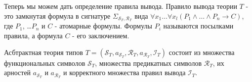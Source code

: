 \documentclass{amsart}
\theoremstyle{definition}
\theoremstyle{remark}
\numberwithin{figure}{section}
\begin{document}
Теперь мы можем дать определение правила вывода.
Правило вывода теории $T$ - это замкнутая формула в сигнатуре $\Sigma_{\mathcal{S}_T, \mathcal{R}_T}$ вида $\forall x_1 \ldots \forall x_l (P_1 \land \ldots \land P_n \to C)$, где $P_1$, \ldots $P_n$ и $C$ - атомарные формулы.
Формулы $P_i$ называются посылками правила, а формула $C$ - его заключением.

\begin{comment}
Пусть $Th$ - произвольная теория сигнатуры $\Sigma_{\mathcal{S}_T, \mathcal{R}_T}$.
Мы будем говорить, что посылка или заключение $P_i$ правила вывода $\forall x_1 \ldots \forall x_l (P_1 \land \ldots \land P_n \to P_{n+1})$ корректно в $Th$, если выполнено одно из следующих условий:
\begin{itemize}
\item $P_i = R(a_1, \ldots a_k)$ для некоторого $R \in \mathcal{R}_T$ и некоторых термов $a_1$, \ldots $a_k$.
\item $P_i = Tm_k(A_1, \ldots A_k, a, A_{k + 1})$ для некоторого $k \in \mathbb{N}$ и некоторых термов $A_1$, \ldots $A_{m + 1}$ и $a$ таких, что для любого $1 \leq j \leq m + 1$ в $Th$ выводима формула $P_1 \land \ldots \land P_{i - 1} \to Ty_{j - 1}(A_1, \ldots A_j)$.
    Кроме того, если $i \leq n$, то $a$ должен быть переменной, и если $i = n + 1$, то либо $a$ является переменной, либо $a = f(b_1, \ldots b_m)$ для некоторого $f \in \mathcal{S}_T$ такого, что $a_{\mathcal{S}_T}(f) = (s_1, \ldots s_m)$ и для всех $1 \leq j \leq m$ в $Th$ выводима либо формула $P_1 \land \ldots \land P_n \to Ty_{s_j}(d_1, \ldots d_{s_j}, b_j)$, либо формула $P_1 \land \ldots \land P_n \to Tm_{s_j}(d_1, \ldots d_{s_j}, b_j, d_{s_j + 1})$ для некоторых $d_1$, \ldots $d_{s_j + 1}$.
\item $P_i = Ty_k(A_1, \ldots A_k, a)$ для некоторого $k \in \mathbb{N}$ и некоторых термов $A_1$, \ldots $A_k$ и $a$ для которых выполнены условия из предыдущего пункта.
\end{itemize}

Мы будем говорить, что правило вывода корректно в $Th$, если все посылки и заключение корректно в $Th$.
Мы будем говорить, что множество правил вывода $\mathcal{I}$ корректно, если каждая правило вывода из $\mathcal{I}$ корректно в $Th_0 \cup \mathcal{I}$, где теория $Th_0$ состоит из следующих формул:
\end{comment}

\begin{defn}
Асбтрактная теория типов $T = (\mathcal{S}_T, a_{\mathcal{S}_T}, \mathcal{R}_T, a_{\mathcal{R}_T}, \mathcal{I}_T)$ состоит из множества функциональных символов $\mathcal{S}_T$, множества предикатных символов $\mathcal{R}_T$, их арностей $a_{\mathcal{S}_T}$ и $a_{\mathcal{R}_T}$ и корректного множества правил вывода $\mathcal{I}_T$.
\end{defn}
\end{document}
